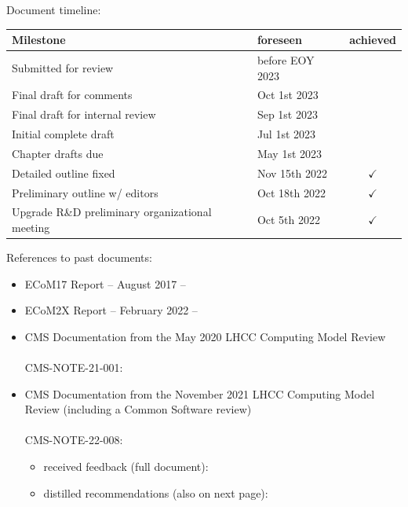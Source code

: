 \vspace*{\fill}
{\large Document timeline:}\\

\begin{tabular}{llc}
\toprule
Milestone & foreseen & achieved\\
\midrule
Submitted for review & before EOY 2023 & \\
Final draft for comments & Oct 1st 2023 & \\
Final draft for internal review & Sep 1st 2023 & \\
Initial complete draft & Jul 1st 2023 & \\
Chapter drafts due & May 1st 2023 & \\
Detailed outline fixed & Nov 15th 2022 & $\checkmark$ \\
Preliminary outline w/ editors & Oct 18th 2022 & $\checkmark$ \\
Upgrade R\&D preliminary organizational meeting & Oct 5th 2022 & $\checkmark$ \\
\bottomrule
\end{tabular}
\vspace*{\fill}

References to past documents:
\begin{itemize}
    \item ECoM17 Report -- August 2017 --\\
    \item ECoM2X Report -- February 2022 --\\
    \item CMS Documentation from the May 2020 LHCC Computing Model Review\\
    \\
    CMS-NOTE-21-001: 
    \item CMS Documentation from the November 2021 LHCC Computing Model Review (including a Common Software review)\\
    \\
    CMS-NOTE-22-008: 
    \begin{itemize}
        \item received feedback (full document): 
        \item distilled recommendations (also on next page): 
    \end{itemize}
\end{itemize}
\vspace*{\fill}

\cleardoublepage
